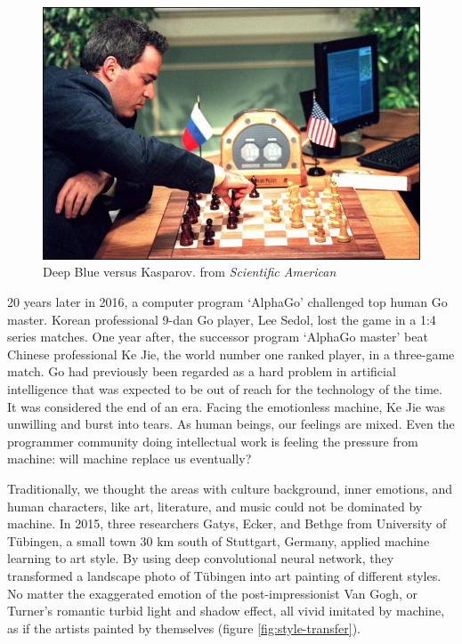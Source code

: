 \documentclass{article}
\begin{document}
\begin{figure}[htbp]
 \centering
 \includegraphics[scale=0.4]{img/Deep-blue-1997.jpg}
 \captionsetup{labelformat=empty}
 \caption{Deep Blue versus Kasparov. from {\em Scientific American}}
 \label{fig:Deep-blue-1997}
\end{figure}

20 years later in 2016, a computer program `AlphaGo' challenged top human Go master. Korean professional 9-dan Go player, Lee Sedol, lost the game in a 1:4 series matches. One year after, the successor program `AlphaGo master' beat Chinese professional Ke Jie, the world number one ranked player, in a three-game match. Go had previously been regarded as a hard problem in artificial intelligence that was expected to be out of reach for the technology of the time. It was considered the end of an era. Facing the emotionless machine, Ke Jie was unwilling and burst into tears. As human beings, our feelings are mixed. Even the programmer community doing intellectual work is feeling the pressure from machine: will machine replace us eventually?

Traditionally, we thought the areas with culture background, inner emotions, and human characters, like art, literature, and music could not be dominated by machine. In 2015, three researchers Gatys, Ecker, and Bethge from University of Tübingen, a small town 30 km south of Stuttgart, Germany, applied machine learning to art style. By using deep convolutional neural network, they transformed a landscape photo of Tübingen into art painting of different styles\cite{Gatys-2015}. No matter the exaggerated emotion of the post-impressionist Van Gogh, or Turner's romantic turbid light and shadow effect, all vivid imitated by machine, as if the artists painted by themselves (figure \ref{fig:style-transfer}).
\end{document}
